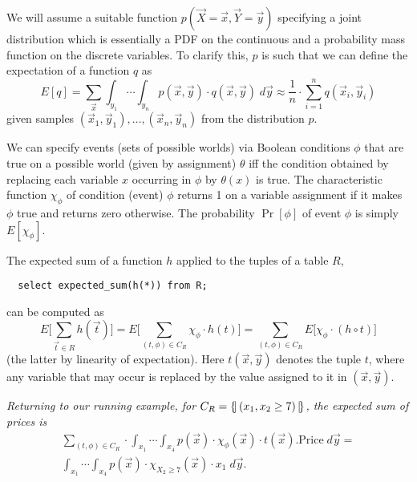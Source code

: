 We    will   assume    a    suitable   function    $p(\vec{X}=\vec{x},
\vec{Y}=\vec{y})$ specifying a joint distribution which is essentially
a  PDF  on the  continuous  and a  probability  mass  function on  the
discrete variables.  To clarify  this, $p$ is such that
we can define the expectation of a function $q$ as
\[
E[q] =
\sum_{\vec{x}} \int_{y_1} \cdots \int_{y_n}
p(\vec{x}, \vec{y}) \cdot q(\vec{x}, \vec{y}) \; d \vec{y} \approx 
\frac{1}{n} \cdot \sum_{i=1}^n q(\vec{x}_i, \vec{y}_i)
\]
given samples $(\vec{x}_1, \vec{y}_1), \dots, (\vec{x}_n, \vec{y}_n)$ from
the distribution $p$.



We can specify events (sets of possible worlds) via Boolean conditions
$\phi$  that  are true  on  a  possible  world (given  by  assignment)
$\theta$  iff the condition  obtained by  replacing each  variable $x$
occurring  in  $\phi$  by  $\theta(x)$ is  true.   The  characteristic
function  $\chi_\phi$  of condition  (event)  $\phi$  returns  1 on  a
variable  assignment  if  it   makes  $\phi$  true  and  returns  zero
otherwise.   The probability  $\Pr[\phi]$  of event  $\phi$ is  simply
$E[\chi_\phi]$.

The expected  sum of a function $h$  applied to the tuples  of a table
$R$,
{\small\begin{verbatim}
  select expected_sum(h(*)) from R;
\end{verbatim}}
can be computed as
\[
E \Big[ \sum_{\vec{t}  \in R}  h(\vec{t}) \Big]  =
E \Big[ \sum_{(t, \phi) \in C_R} \chi_\phi \cdot h(t) \Big] =
\sum_{(t, \phi) \in C_R} E \Big[ \chi_\phi \cdot (h \circ t) \Big]
\]
(the latter by linearity of expectation).
Here $t(\vec{x}, \vec{y})$ denotes
the tuple $t$, where any variable that may occur is replaced by
the value assigned to it in $(\vec{x}, \vec{y})$.


\begin{example}\em
Returning to our running example, for $C_R = \{\!|\, (x_1, x_2 \ge 7) \,|\!\}$, the expected sum of prices is
\begin{multline*}
   \sum_{(t,  \phi) \in  C_R} \cdot  
   \int_{x_1} \cdots
   \int_{x_4}  p(\vec{x})  \cdot  \chi_\phi(\vec{x})
   \cdot t(\vec{x}).\mathrm{Price} \; d \vec{y}
= \\
   \int_{x_1} \cdots
   \int_{x_4}  p(\vec{x})  \cdot  \chi_{X_2 \ge 7}(\vec{x})
   \cdot x_1 \; d \vec{y}.
\end{multline*}
\end{example}\ \\



